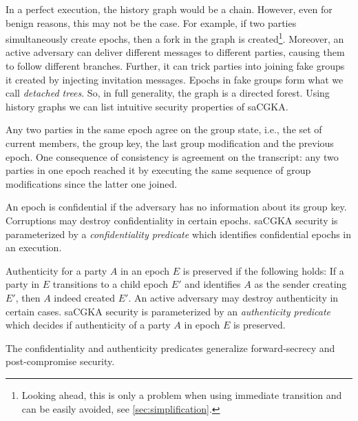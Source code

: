 In a perfect execution, the history graph would be a chain. However, even for
benign reasons, this may not be the case. For example, if two parties
simultaneously create epochs, then a fork in the graph is created\footnote{Looking ahead, this is only a problem when
  using immediate transition and can be easily avoided, see \cref{sec:simplification}.}. Moreover,
an active adversary can deliver different messages to different parties,
causing them to follow different branches. Further, it can trick parties into
joining fake groups it created by injecting invitation messages. Epochs in
fake groups form what we call \emph{detached trees}. So, in full generality,
the graph is a directed forest.
%
Using history graphs we can list intuitive security properties of saCGKA.
\begin{description}[itemsep=2pt,topsep=2pt,parsep=2pt]
  \item[Consistency] Any two parties in the same epoch agree on the group state, i.e., the set of current members, the group key, the last group modification and the previous epoch. One consequence of consistency is agreement on the transcript: any two parties in one epoch reached it by executing the same sequence of group modifications since the latter one joined.
  \item[Confidentiality] An epoch is confidential if the adversary has no information about its group key. Corruptions may destroy confidentiality in certain epochs. saCGKA security is parameterized by a \emph{confidentiality predicate} which identifies confidential epochs in an execution.
  \item[Authenticity] Authenticity for a party $A$ in an epoch $E$ is preserved if the following holds: If a party in $E$ transitions to a child epoch $E'$ and identifies $A$ as the sender creating $E'$, then $A$ indeed created $E'$. An active adversary may destroy authenticity in certain cases. saCGKA security is parameterized by an \emph{authenticity predicate} which decides if authenticity of a party $A$ in epoch $E$ is preserved.
\end{description}
The confidentiality and authenticity predicates %
generalize forward-secrecy and post-compromise security.

